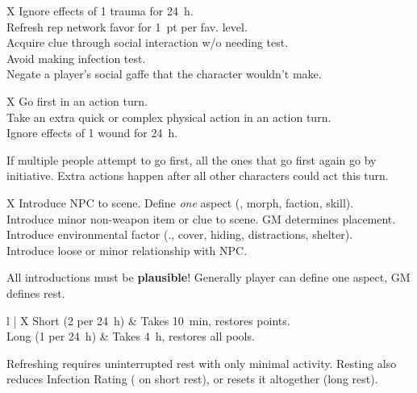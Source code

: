\bigskip



\begin{eptable}{X}
   Ignore effects of \num{1} trauma for \SI{24}{h}.\\
   Refresh rep network favor for \SI{1}{pt} per fav. level.\\
   Acquire clue through social interaction w/o needing test.\\
   Avoid making infection test.\\
   Negate a player’s social gaffe that the character wouldn’t make.\\
\end{eptable}

\bigskip



\begin{eptable}{X}
   Go first in an action turn.\\
   Take an extra quick or complex physical action in an action turn.\\
   Ignore effects of \num{1} wound for \SI{24}{h}.\\
\end{eptable}

If multiple people attempt to go first, all the ones that go first
again go by initiative. Extra actions happen after all other characters
could act this turn.

\bigskip



\begin{eptable}{X}
   Introduce NPC to scene. Define \textit{one} aspect (\eg, morph, faction, skill).\\
   Introduce minor non-weapon item or clue to scene. GM determines placement.\\
   Introduce environmental factor (\eg., cover, hiding, distractions, shelter).\\
   Introduce loose or minor relationship with NPC.\\
\end{eptable}

All introductions must be \textbf{plausible}! Generally player
can define one aspect, GM defines rest.

\bigskip


\begin{eptable}{l | X}
   Short (2 per \SI{24}{h}) & Takes \SI{10}{min}, restores  points.\\
   Long (1 per \SI{24}{h}) & Takes \SI{4}{h}, restores all pools.\\
\end{eptable}

\begin{itemize}
    \itembox Refreshing requires uninterrupted rest with only minimal activity.
    \itembox Resting also reduces Infection Rating ( on short rest), or resets it altogether (long rest).
\end{itemize}
